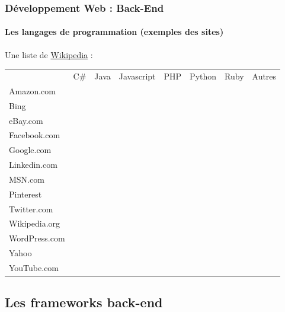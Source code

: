 \documentclass[xcolor=table]{beamer}
\begin{document}
\begin{frame}
\frametitle{Développement Web : Back-End}
\framesubtitle{Les langages de programmation (exemples des sites)}

Une liste de \href{https://en.wikipedia.org/wiki/Programming_languages_used_in_most_popular_websites}{Wikipedia} :

\scriptsize\bfseries
{}
\begin{center}
	\begin{tabular}{llllllll}
	\rowcolor{darkblue}
	 & \color{white}C\# & \color{white}Java & \color{white}Javascript & \color{white}PHP & \color{white}Python & \color{white}Ruby & \color{white}Autres \\
	Amazon.com &  & \checkmark &  &  &  &  & \checkmark \\
	Bing & \checkmark  & &  &  &  &  & \checkmark \\
	eBay.com &  & \checkmark & \checkmark  &  &  &  & \checkmark \\
	Facebook.com &  & \checkmark &   & \checkmark & \checkmark &  & \checkmark \\
	Google.com &  & \checkmark &  &  & \checkmark  &  & \checkmark \\
	Linkedin.com &  & \checkmark & \checkmark  &  &  &  & \checkmark  \\
	MSN.com & \checkmark  & &  &  &  &  &  \\
	Pinterest &  & &  &  & \checkmark &  & \checkmark \\
	Twitter.com &  & \checkmark &  &  &  & \checkmark & \checkmark  \\
	Wikipedia.org &  & &  & \checkmark &  &  &  \\
	WordPress.com &  & &  & \checkmark &  &  &  \\
	Yahoo &  & &  & \checkmark &  &  &  \\
	YouTube.com &  & \checkmark &  &  & \checkmark  &  & \checkmark \\
\end{tabular}
\end{center}

\end{frame}

\subsection{Les frameworks back-end}
\end{document}
